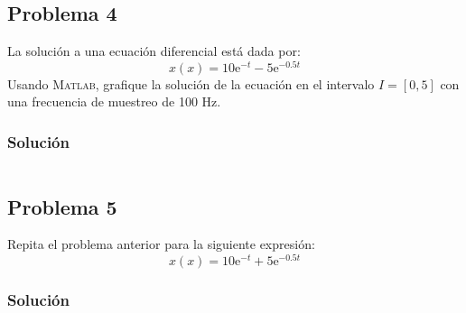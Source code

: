 \documentclass[a4paper,12pt,final]{article}
\begin{document}
      \vspace{\fill}

  \newpage
  \subsection*{Problema 4}
    \noindent La solución a una ecuación diferencial está dada por:
    $$x\left(x\right) = 10\mathrm{e}^{-t} - 5\mathrm{e}^{-0.5t}$$
    Usando \textsc{Matlab}, grafique la solución de la ecuación en el intervalo
    $I=\left[0,5\right]$ con una frecuencia de muestreo de 100 Hz.

    \subsubsection*{Solución}
      \begin{listing}[H]
        \caption{}
        \label{script04}
        \inputminted{matlab}{./laboratorio_2/problema04.m}
      \end{listing}

      \vspace{\fill}

  \newpage
  \subsection*{Problema 5}
    \noindent Repita el problema anterior para la siguiente expresión:
    $$x\left(x\right) = 10\mathrm{e}^{-t} + 5\mathrm{e}^{-0.5t}$$

    \subsubsection*{Solución}
      \begin{listing}[H]
        \caption{}
        \label{script05}
        \inputminted{matlab}{./laboratorio_2/problema05.m}
      \end{listing}
\end{document}
